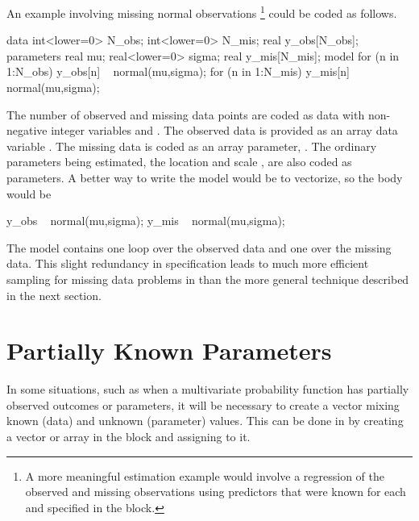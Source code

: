 An example involving missing normal observations%
%
\footnote{A more meaningful estimation example would involve a
  regression of the observed and missing observations using predictors
  that were known for each and specified in the  block.}
%
could be coded as follows.
%
\begin{stancode}
data {
  int<lower=0> N_obs;
  int<lower=0> N_mis;
  real y_obs[N_obs];
}
parameters {
  real mu;
  real<lower=0> sigma;
  real y_mis[N_mis];
}
model {
  for (n in 1:N_obs)
    y_obs[n] ~ normal(mu,sigma);
  for (n in 1:N_mis)
    y_mis[n] ~ normal(mu,sigma);
}
\end{stancode}
%
The number of observed and missing data points are coded as data with
non-negative integer variables  and .  The
observed data is provided as an array data variable .
The missing data is coded as an array parameter, .  The
ordinary parameters being estimated, the location  and scale
, are also coded as parameters.  A better way to write the
model would be to vectorize, so the body would be
%
\begin{stancode}
   y_obs ~ normal(mu,sigma);
   y_mis ~ normal(mu,sigma);
\end{stancode}

The model contains one loop over the observed data and one over the
missing data.  This slight redundancy in specification leads to much
more efficient sampling for missing data problems in \Stan than the
more general technique described in the next section.


\section{Partially Known Parameters}\label{partially-known-parameters.section}

In some situations, such as when a multivariate probability function
has partially observed outcomes or parameters, it will be necessary to
create a vector mixing known (data) and unknown (parameter) values.
This can be done in \Stan by creating a vector or array in the
 block and assigning to it.

